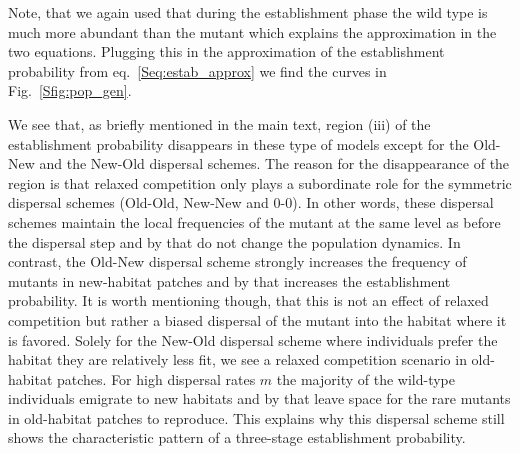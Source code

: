 \documentclass[11pt]{article}
\newcommand{\chg}[1]{\textcolor{change}{#1}}
\begin{document}
\chg{Note, that we again used that during the establishment phase the wild type is much more abundant than the mutant which explains the approximation in the two equations.}
Plugging this in the approximation of the establishment probability from eq.~\eqref{Seq:estab_approx} we find the curves in Fig.~\ref{Sfig:pop_gen}.

We see that, as briefly mentioned in the main text, region (iii) of the establishment probability disappears in these type of models except for the Old-New and the New-Old dispersal schemes. The reason for the disappearance of the region is that relaxed competition only plays a subordinate role for the symmetric dispersal schemes (Old-Old, New-New and 0-0). In other words, these dispersal schemes maintain the local frequencies of the mutant at the same level as before the dispersal step and by that do not change the population dynamics. In contrast, the Old-New dispersal scheme strongly increases the frequency of mutants in new-habitat patches and by that increases the establishment probability. It is worth mentioning though, that this is not an effect of relaxed competition but rather a biased dispersal of the mutant into the habitat where it is favored. Solely for the New-Old dispersal scheme where individuals prefer the habitat they are relatively less fit, we see a relaxed competition scenario in old-habitat patches. For high dispersal rates $m$ the majority of the wild-type individuals emigrate to new habitats and by that leave space for the rare mutants in old-habitat patches to reproduce. This explains why this dispersal scheme still shows the characteristic pattern of a three-stage establishment probability.   \newpage 
\end{document}
